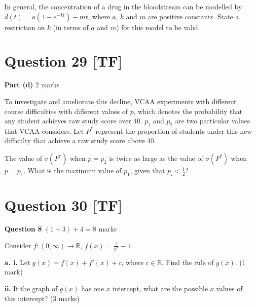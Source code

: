 \documentclass[10pt,a4paper]{article}
\begin{document}
In general, the concentration of a drug in the bloodstream can be modelled by $d(t) = a(1 - e^{-kt}) - mt$, where $a$, $k$ and $m$ are positive constants. State a restriction on $k$ (in terms of $a$ and $m$) for this model to be valid.

\vspace{9\baselineskip}

\hrulefill

\section*{Question 29 [TF]}

\textbf{Part (d)} \hfill 2 marks

To investigate and ameliorate this decline, VCAA experiments with different course difficulties with different values of $p$, which denotes the probability that any student achieves raw study score over 40. $p_1$ and $p_2$ are two particular values that VCAA considers. Let $P^*$ represent the proportion of students under this new difficulty that achieve a raw study score above 40.

The value of $\sigma(P^*)$ when $p = p_2$ is twice as large as the value of $\sigma(P^*)$ when $p = p_1$. What is the maximum value of $p_1$, given that $p_i < \frac{1}{2}$?

\vspace{9\baselineskip}

\hrulefill

\section*{Question 30 [TF]}

\textbf{Question 8} \hfill $(1+3)+4 = 8$ marks

Consider $f : (0,\infty) \to \mathbb{R}$, $f(x) = \frac{1}{x^2} - 1$.

\textbf{a. i.} Let $g(x) = f(x) + f'(x) + c$, where $c \in \mathbb{R}$. Find the rule of $g(x)$. \hfill (1 mark)

\vspace{9\baselineskip}

\textbf{ii.} If the graph of $g(x)$ has one $x$ intercept, what are the possible $x$ values of this intercept? \hfill (3 marks)

\vspace{9\baselineskip}
\end{document}
